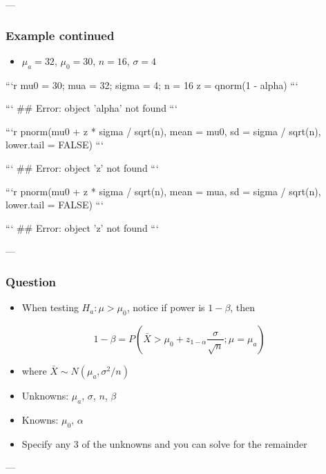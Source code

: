\documentclass[10pt,article]{article}
\begin{document}
---
\subsubsection{Example continued}
\label{sec:org5e81ed3}
\begin{itemize}
\item \(\mu_a = 32\), \(\mu_0 = 30\), \(n =16\), \(\sigma = 4\)
\end{itemize}

```r
mu0 = 30; mua = 32; sigma = 4; n = 16
z = qnorm(1 - alpha)
```

```
\#\# Error: object 'alpha' not found
```

```r
pnorm(mu0 + z * sigma / sqrt(n), mean = mu0, sd = sigma / sqrt(n),
      lower.tail = FALSE)
```

```
\#\# Error: object 'z' not found
```

```r
pnorm(mu0 + z * sigma / sqrt(n), mean = mua, sd = sigma / sqrt(n),
      lower.tail = FALSE)
```

```
\#\# Error: object 'z' not found
```

---
\subsubsection{Question}
\label{sec:orga6b6b35}
\begin{itemize}
\item When testing \(H_a : \mu > \mu_0\), notice if power is \(1 - \beta\), then
\end{itemize}
$$1 - \beta = P\left(\bar X > \mu_0 + z_{1-\alpha} \frac{\sigma}{\sqrt{n}} ; \mu = \mu_a \right)$$
\begin{itemize}
\item where \(\bar X \sim N(\mu_a, \sigma^2 / n)\)
\item Unknowns: \(\mu_a\), \(\sigma\), \(n\), \(\beta\)
\item Knowns: \(\mu_0\), \(\alpha\)
\item Specify any 3 of the unknowns and you can solve for the remainder
\end{itemize}

---
\end{document}
